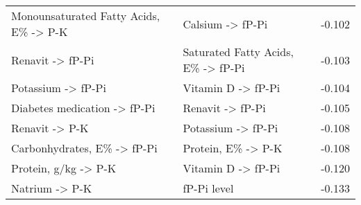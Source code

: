 \documentclass[border=1mm, preview]{standalone}
\begin{document}
\begin{table}[H]
{\begin{tabular}{llr}
Monounsaturated Fatty Acids, E\% -> P-K & Calsium -> fP-Pi & -0.102\\
Renavit -> fP-Pi & Saturated Fatty Acids, E\% -> fP-Pi & -0.103\\
Potassium -> fP-Pi & Vitamin D -> fP-Pi & -0.104\\
\addlinespace
Diabetes medication -> fP-Pi & Renavit -> fP-Pi & -0.105\\
Renavit -> P-K & Potassium -> fP-Pi & -0.108\\
Carbonhydrates, E\% -> fP-Pi & Protein, E\% -> P-K & -0.108\\
Protein, g/kg -> P-K & Vitamin D -> fP-Pi & -0.120\\
Natrium -> P-K & fP-Pi level & -0.133\\
\bottomrule
\end{tabular}}
\end{table}
\end{document}
